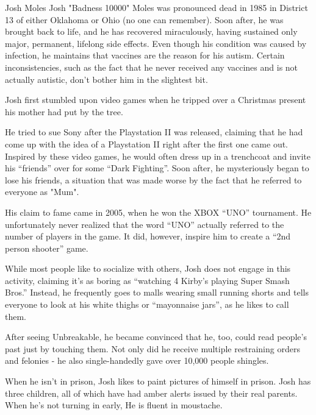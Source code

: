 \documentclass[journal]{IEEEtran}
\begin{document}
\begin{IEEEbiography}{Josh Moles}
Josh "Badness 10000" Moles was pronounced dead in 1985 in District 13 of either Oklahoma or Ohio (no one can remember).  Soon after, he was brought back to life, and he has recovered miraculously, having sustained only major, permanent, lifelong side effects.  Even though his condition was caused by infection, he maintains that vaccines are the reason for his autism.  Certain inconsistencies, such as the fact that he never received any vaccines and is not actually autistic, don't bother him in the slightest bit.  

Josh first stumbled upon video games when he tripped over a Christmas present his mother had put by the tree. 

He tried to sue Sony after the Playstation II was released, claiming that he had come up with the idea of a Playstation II right after the first one came out.  Inspired by these video games, he would often dress up in a trenchcoat 
and invite his ``friends'' over for some ``Dark Fighting''.  Soon after, he mysteriously began to lose his friends, a situation that was made worse by the fact that he referred to everyone as "Mum". 

His claim to fame came in 2005, when he won the XBOX ``UNO'' tournament.  He unfortunately never realized that the word  ``UNO'' actually referred to the number of players in the game.  It did, however, inspire him to create a ``2nd person shooter'' game. 

While most people like to socialize with others, Josh does not engage in this activity, claiming it's as boring as ``watching 4 Kirby's playing Super Smash Bros.''  Instead, he frequently goes to malls wearing small running shorts and tells everyone to look at his white thighs or ``mayonnaise jars'', as he likes to call them.  

After seeing Unbreakable, he became convinced that he, too, could read people's past just by touching them. Not only did he receive multiple restraining orders and felonies - he also single-handedly gave over 10,000 people shingles.


When he isn't in prison, Josh likes to paint pictures of himself in prison.  
Josh has three children, all of which have had amber alerts issued by their real parents.  When he's not turning in early, 
He is fluent in moustache. 

\end{IEEEbiography}
\end{document}
